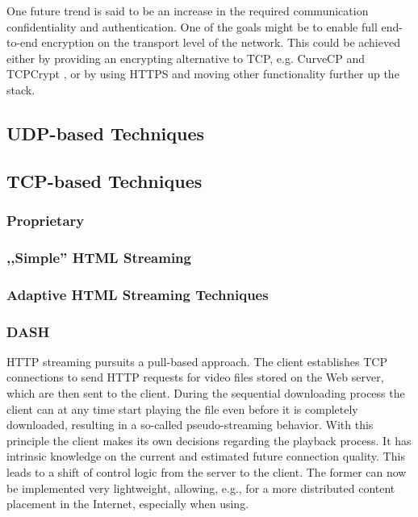 One future trend is said to be an increase in the required communication confidentiality and authentication. One of the goals might be to enable full end-to-end encryption on the transport level of the network. This could be achieved either by providing an encrypting alternative to TCP, e.g. CurveCP \cite{curvecpwww} and TCPCrypt \cite{tcpcrypt}, or by using HTTPS and moving other functionality further up the stack.


\subsection{UDP-based Techniques}


\subsection{TCP-based Techniques}
\subsubsection{Proprietary}
\subsubsection{,,Simple'' HTML Streaming}
\subsubsection{Adaptive HTML Streaming Techniques}
\subsubsection{\gls{DASH}}


HTTP streaming pursuits a pull-based approach. The client establishes TCP connections to send HTTP requests for video files stored on the Web server, which are then sent to the client. During the sequential downloading process the client can at any time start playing the file even before it is completely downloaded, resulting in a so-called pseudo-streaming behavior.
With this principle the client makes its own decisions regarding the playback process. It has intrinsic knowledge on the current and estimated future connection quality. This leads to a shift of control logic from the server to the client. The former can now be implemented very lightweight, allowing, e.g., for a more distributed content placement in the Internet, especially when using.

